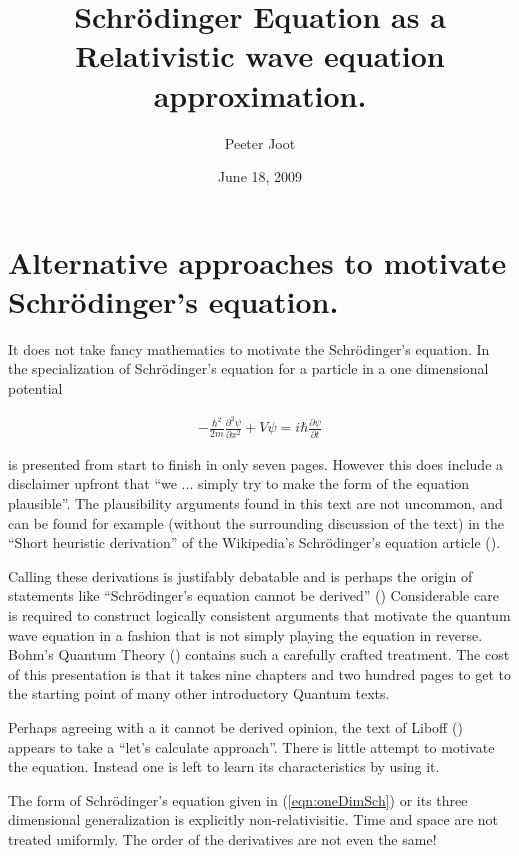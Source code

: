 \documentclass[]{eliblog}
\title{Schr\"{o}dinger Equation as a Relativistic wave equation approximation.}
\author{Peeter Joot}
\date{June 18, 2009}
\begin{document}
\maketitle

\section{Alternative approaches to motivate Schr\"{o}dinger's equation.}

It does not take fancy mathematics to motivate the Schr\"{o}dinger's equation.  In
\cite{french1998iqp} the specialization of Schr\"{o}dinger's equation for a 
particle in a one dimensional potential

\begin{align}\label{eqn:oneDimSch}
-\frac{\hbar^2}{2m} \frac{\partial^2 \psi}{\partial x^2} + V\psi = i \hbar \frac{\partial \psi}{\partial t}
\end{align}

is presented from start to finish in only seven pages.  However this does include a disclaimer upfront that
``we ... simply try to make the form of the equation plausible''.  The plausibility arguments
found in this text are not uncommon, and can be found for example (without the surrounding discussion of the text) 
in the ``Short heuristic derivation'' of the Wikipedia's Schr\"{o}dinger's equation article (\cite{wikiSchH}).

Calling these derivations is justifably debatable and is perhaps the origin of statements like
``Schr\"{o}dinger's equation cannot be derived'' (\cite{hyperphysicsSch})
Considerable care 
is required to construct logically consistent arguments that motivate the quantum wave
equation in a fashion that is not simply playing the equation in reverse.  Bohm's Quantum Theory
(\cite{bohm1989qt}) contains such a carefully crafted treatment.  The cost 
of this presentation
is that it takes nine chapters and two hundred pages to get to
the starting point of many other introductory Quantum texts.

Perhaps agreeing with a it cannot be derived opinion, the text of Liboff (\cite{liboff2003iqm}) appears to take a 
``let's calculate approach''.  There is little attempt to motivate the equation.  Instead one is left to learn
its characteristics by using it.

The form of Schr\"{o}dinger's equation given in (\ref{eqn:oneDimSch}) or its three dimensional generalization is
explicitly non-relativisitic.  Time and space are not treated uniformly.  The order of the derivatives are not
even the same!
\end{document}
